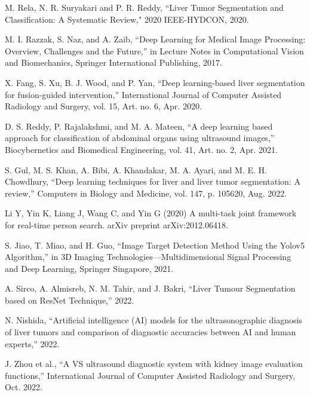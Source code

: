 \documentclass[12pt, a4paper]{article}
\begin{document}
\begin{thebibliography}{99}
M. Rela, N. R. Suryakari and P. R. Reddy, “Liver Tumor Segmentation and Classification: A Systematic Review," 2020 IEEE-HYDCON, 2020.

M. I. Razzak, S. Naz, and A. Zaib, “Deep Learning for Medical Image Processing: Overview, Challenges and the Future,” in Lecture Notes in Computational Vision and Biomechanics, Springer International Publishing, 2017.

X. Fang, S. Xu, B. J. Wood, and P. Yan, “Deep learning-based liver segmentation for fusion-guided intervention,” International Journal of Computer Assisted Radiology and Surgery, vol. 15, Art. no. 6, Apr. 2020.

D. S. Reddy, P. Rajalakshmi, and M. A. Mateen, “A deep learning based approach for classification of abdominal organs using ultrasound images,” Biocybernetics and Biomedical Engineering, vol. 41, Art. no. 2, Apr. 2021.

S. Gul, M. S. Khan, A. Bibi, A. Khandakar, M. A. Ayari, and M. E. H. Chowdhury, “Deep learning techniques for liver and liver tumor segmentation: A review,” Computers in Biology and Medicine, vol. 147, p. 105620, Aug. 2022.

Li Y, Yin K, Liang J, Wang C, and Yin G (2020) A multi-task joint framework for real-time person search. arXiv preprint arXiv:2012.06418.

S. Jiao, T. Miao, and H. Guo, “Image Target Detection Method Using the Yolov5 Algorithm,” in 3D Imaging Technologies—Multidimensional Signal Processing and Deep Learning, Springer Singapore, 2021.

A. Sirco, A. Almisreb, N. M. Tahir, and J. Bakri, “Liver Tumour Segmentation based on ResNet Technique,” 2022.

N. Nishida, “Artificial intelligence (AI) models for the ultrasonographic diagnosis of liver tumors and comparison of diagnostic accuracies between AI and human experts,” 2022.

J. Zhou et al., “A VS ultrasound diagnostic system with kidney image evaluation functions,” International Journal of Computer Assisted Radiology and Surgery, Oct. 2022.






\end{thebibliography}
\end{document}
